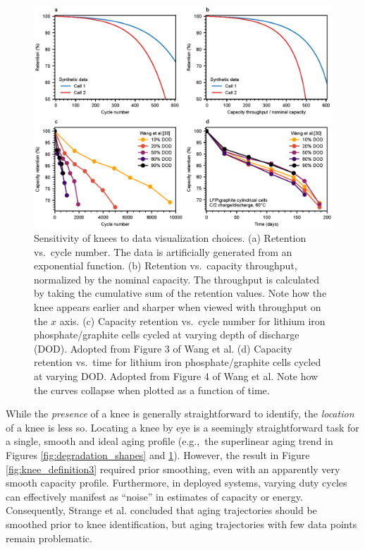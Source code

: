 \documentclass[journal=jpclcd,manuscript=article]{achemso}
\begin{document}
\begin{figure}[!ht]
\centering
\includegraphics[scale=1]{figures/x_axis_sensitivity.eps}
\caption{Sensitivity of knees to data visualization choices.
(a) Retention vs.~cycle number. The data is artificially generated from an exponential function. 
(b) Retention vs.~capacity throughput, normalized by the nominal capacity. The throughput is calculated by taking the cumulative sum of the retention values.
Note how the knee appears earlier and sharper when viewed with throughput on the $x$ axis.
(c) Capacity retention vs.~cycle number for lithium iron phosphate/graphite cells cycled at varying depth of discharge (DOD). Adopted from Figure 3 of Wang et al.\cite{wang_cycle-life_2011}
(d) Capacity retention vs.~time for lithium iron phosphate/graphite cells cycled at varying DOD. Adopted from Figure 4 of Wang et al.\cite{wang_cycle-life_2011} Note how the curves collapse when plotted as a function of time.
}
\label{fig:x_axis}
\end{figure}

While the \textit{presence} of a knee is generally straightforward to identify, the \textit{location} of a knee is less so.
Locating a knee by eye is a seemingly straightforward task for a single, smooth and ideal aging profile (e.g.,~the superlinear aging trend in Figures \ref{fig:degradation_shapes} and \ref{fig:x_axis}). 
However, the result in Figure \ref{fig:knee_definition3} required prior smoothing, even with an apparently very smooth capacity profile.
Furthermore, in deployed systems, varying duty cycles can effectively manifest as ``noise'' in estimates of capacity or energy.
Consequently, Strange et al.\cite{strange_elbows_2021} concluded that aging trajectories should be smoothed prior to knee identification, but aging trajectories with few data points remain problematic.
\end{document}
